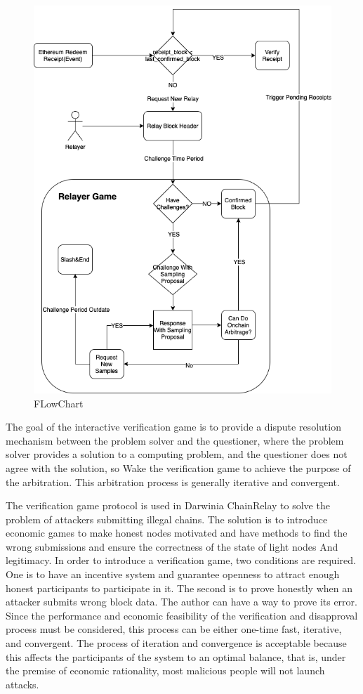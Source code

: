 \begin{figure}
    \centering
    \includegraphics[scale=0.5]{pic/flowchart.png}
    \caption{FLowChart}
    \label{fig:my_label}
\end{figure}

The goal of the interactive verification game is to provide a dispute resolution mechanism between the problem solver and the questioner, where the problem solver provides a solution to a computing problem, and the questioner does not agree with the solution, so Wake the verification game to achieve the purpose of the arbitration. This arbitration process is generally iterative and convergent.

The verification game protocol is used in Darwinia ChainRelay to solve the problem of attackers submitting illegal chains. The solution is to introduce economic games to make honest nodes motivated and have methods to find the wrong submissions and ensure the correctness of the state of light nodes And legitimacy. In order to introduce a verification game, two conditions are required. One is to have an incentive system and guarantee openness to attract enough honest participants to participate in it. The second is to prove honestly when an attacker submits wrong block data. The author can have a way to prove its error. Since the performance and economic feasibility of the verification and disapproval process must be considered, this process can be either one-time fast, iterative, and convergent. The process of iteration and convergence is acceptable because this affects the participants of the system to an optimal balance, that is, under the premise of economic rationality, most malicious people will not launch attacks.

